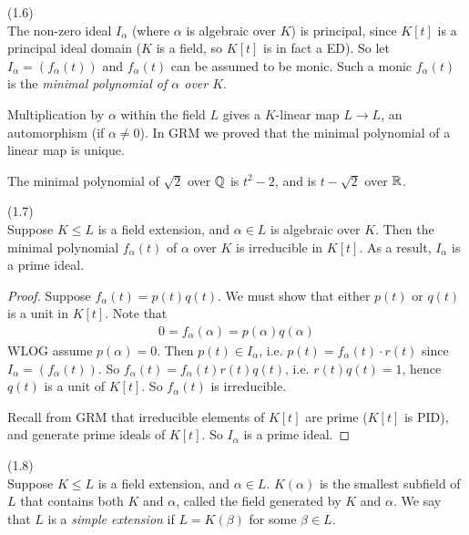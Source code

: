 \documentclass[a4paper]{article}
\begin{document}
\begin{defi}(1.6)\\
The non-zero ideal $I_\alpha$ (where $\alpha$ is algebraic over $K$) is principal, since $K[t]$ is a principal ideal domain ($K$ is a field, so $K[t]$ is in fact a ED). So let $I_\alpha = (f_\alpha(t))$ and $f_\alpha(t)$ can be assumed to be monic. Such a monic $f_\alpha(t)$ is the \emph{minimal polynomial of $\alpha$ over $K$}.
\end{defi}

\begin{rem}
Multiplication by $\alpha$ within the field $L$ gives a $K$-linear map $L \to L$, an automorphism (if $\alpha \neq 0$). In GRM we proved that the minimal polynomial of a linear map is unique.
\end{rem}

\begin{eg}
The minimal polynomial of $\sqrt{2}$ over $\mathbb{Q}$ is $t^2-2$, and is $t-\sqrt{2}$ over $\mathbb{R}$.
\end{eg}

\begin{lemma}(1.7)\\
Suppose $K \leq L$ is a field extension, and $\alpha \in L$ is algebraic over $K$. Then the minimal polynomial $f_\alpha(t)$ of $\alpha$ over $K$ is irreducible in $K[t]$. As a result, $I_\alpha$ is a prime ideal.
\begin{proof}
Suppose $f_\alpha(t) = p(t) q(t)$. We must show that either $p(t)$ or $q(t)$ is a unit in $K[t]$. Note that 
\begin{equation*}
\begin{aligned}
0 = f_\alpha(\alpha) = p(\alpha)q(\alpha)
\end{aligned}
\end{equation*}
WLOG assume $p(\alpha)=0$. Then $p(t) \in I_\alpha$, i.e. $p(t) = f_\alpha(t) \cdot r(t)$ since $I_\alpha = (f_\alpha(t))$. So $f_\alpha(t) = f_\alpha(t) r(t) q(t)$, i.e. $r(t) q(t) = 1$, hence $q(t)$ is a unit of $K[t]$. So $f_\alpha(t)$ is irreducible.

Recall from GRM that irreducible elements of $K[t]$ are prime ($K[t]$ is PID), and generate prime ideals of $K[t]$. So $I_\alpha$ is a prime ideal.
\end{proof}
\end{lemma}

\begin{defi} (1.8)\\
Suppose $K \leq L$ is a field extension, and $\alpha \in L$. $K(\alpha)$ is the smallest subfield of $L$ that contains both $K$ and $\alpha$, called the field generated by $K$ and $\alpha$. We say that $L$ is a \emph{simple extension} if $L=K(\beta)$ for some $\beta \in L$.
\end{defi}
\end{document}
